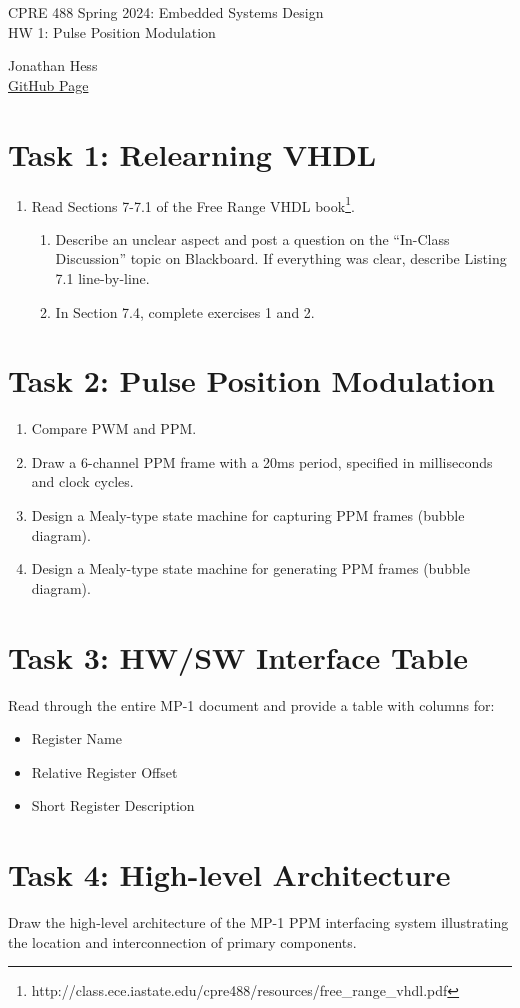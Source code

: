 \documentclass[10pt,a4paper]{article}
\author{}
\date{}
\begin{document}
\begin{flushleft}
\begin{LARGE}CPRE 488 Spring 2024: Embedded Systems Design\\
HW 1: Pulse Position Modulation \\
\end{LARGE}

Jonathan Hess
\\\href{https://github.com/Jetsama/EE435/tree/main/HW2}{GitHub Page}
\end{flushleft}
\author{}
\date{}




\section*{Task 1: Relearning VHDL}
\begin{enumerate}
    \item Read Sections 7-7.1 of the Free Range VHDL book\footnote{http://class.ece.iastate.edu/cpre488/resources/free\_range\_vhdl.pdf}.
    \begin{enumerate}
        \item Describe an unclear aspect and post a question on the “In-Class Discussion” topic on Blackboard. If everything was clear, describe Listing 7.1 line-by-line.
        \item In Section 7.4, complete exercises 1 and 2.
    \end{enumerate}
\end{enumerate}

\section*{Task 2: Pulse Position Modulation}
\begin{enumerate}
    \item Compare PWM and PPM.
    \item Draw a 6-channel PPM frame with a 20ms period, specified in milliseconds and clock cycles.
    \item Design a Mealy-type state machine for capturing PPM frames (bubble diagram).
    \item Design a Mealy-type state machine for generating PPM frames (bubble diagram).
\end{enumerate}

\section*{Task 3: HW/SW Interface Table}
Read through the entire MP-1 document and provide a table with columns for:
\begin{itemize}
    \item Register Name
    \item Relative Register Offset
    \item Short Register Description
\end{itemize}

\section*{Task 4: High-level Architecture}
Draw the high-level architecture of the MP-1 PPM interfacing system illustrating the location and interconnection of primary components.
\end{document}
